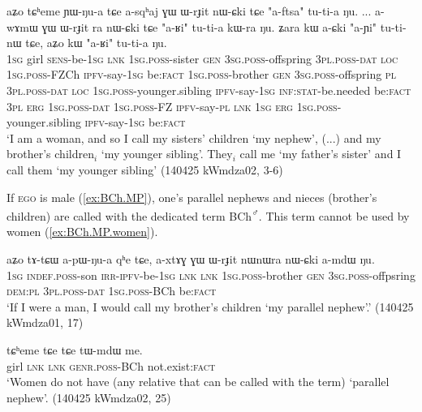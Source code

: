 \begin{exe}
\ex \label{ex:ZCh.BCh.FP}
\gll aʑo tɕʰeme ɲɯ-ŋu-a tɕe a-sqʰaj ɣɯ ɯ-rɟit nɯ-ɕki tɕe "a-ftsa" tu-ti-a ŋu.
... a-wɤmɯ ɣɯ ɯ-rɟit ra nɯ-ɕki tɕe "a-ʁi" tu-ti-a kɯ-ra ŋu. ʑara kɯ a-ɕki "a-ɲi" tu-ti-nɯ tɕe, aʑo kɯ "a-ʁi" tu-ti-a ŋu. \\
\textsc{1sg} girl \textsc{sens}-be-\textsc{1sg} \textsc{lnk} \textsc{1sg}.\textsc{poss}-sister \textsc{gen} \textsc{3sg}.\textsc{poss}-offspring \textsc{3pl}.\textsc{poss}-\textsc{dat} \textsc{loc}  \textsc{1sg}.\textsc{poss}-FZCh \textsc{ipfv}-say-\textsc{1sg} be:\textsc{fact} { } \textsc{1sg}.\textsc{poss}-brother \textsc{gen} \textsc{3sg}.\textsc{poss}-offspring \textsc{pl} \textsc{3pl}.\textsc{poss}-\textsc{dat} \textsc{loc} \textsc{1sg}.\textsc{poss}-younger.sibling \textsc{ipfv}-say-\textsc{1sg} \textsc{inf}:\textsc{stat}-be.needed be:\textsc{fact} \textsc{3pl} \textsc{erg} \textsc{1sg}.\textsc{poss}-\textsc{dat} \textsc{1sg}.\textsc{poss}-FZ \textsc{ipfv}-say-\textsc{pl} \textsc{lnk} \textsc{1sg} \textsc{erg} \textsc{1sg}.\textsc{poss}-younger.sibling \textsc{ipfv}-say-\textsc{1sg} be:\textsc{fact} \\
\glt `I am a woman, and so I call my sisters' children  `my nephew', (...) and my brother's children$_i$  `my younger sibling'. They$_i$ call me  `my father's sister' and I call them  `my younger sibling' (140425 kWmdza02, 3-6)
\end{exe}

If \textsc{ego} is male (\ref{ex:BCh.MP}), one's parallel nephews and nieces (brother's children) are called with the dedicated term  BCh\textsuperscript{♂}. This term cannot be used by women (\ref{ex:BCh.MP.women}). 

\begin{exe}
\ex \label{ex:BCh.MP}
\gll  aʑo tɤ-tɕɯ a-pɯ-ŋu-a qʰe tɕe, a-xtɤɣ ɣɯ ɯ-rɟit nɯnɯra nɯ-ɕki a-mdɯ ŋu. \\
\textsc{1sg} \textsc{indef}.\textsc{poss}-son \textsc{irr}-\textsc{ipfv}-be-\textsc{1sg} \textsc{lnk} \textsc{lnk} \textsc{1sg}.\textsc{poss}-brother \textsc{gen} \textsc{3sg}.\textsc{poss}-offpsring \textsc{dem}:\textsc{pl} \textsc{3pl}.\textsc{poss}-\textsc{dat} \textsc{1sg}.\textsc{poss}-BCh be:\textsc{fact} \\
\glt `If I were a man, I would call my brother's children  `my parallel nephew'.' (140425 kWmdza01, 17)
\end{exe}


\begin{exe}
\ex \label{ex:BCh.MP.women}
\gll tɕʰeme tɕe tɕe tɯ-mdɯ me. \\
girl \textsc{lnk} \textsc{lnk} \textsc{genr}.\textsc{poss}-BCh not.exist:\textsc{fact} \\
\glt `Women do not have (any relative that can be called with the term)  `parallel nephew'. (140425 kWmdza02, 25)
\end{exe}

